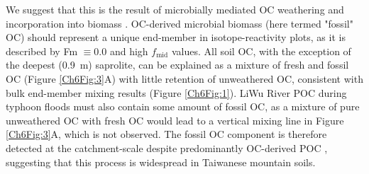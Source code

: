 We suggest that this is the result of microbially mediated OC weathering and incorporation into biomass \citep{Petsch:2001eq,Petsch:2005gd,Bardgett:2007eb,Schillawski:2008ko,Petsch:2014ct}. OC-derived microbial biomass (here termed "fossil" OC) should represent a unique end-member in isotope-reactivity plots, as it is described by Fm $\equiv 0.0$ and high $f_{\text{mid}}$ values. All soil OC, with the exception of the deepest (\SI{0.9}{m}) saprolite, can be explained as a mixture of fresh and fossil OC (Figure \ref{Ch6Fig:3}A) with little retention of unweathered OC, consistent with bulk end-member mixing results (Figure \ref{Ch6Fig:1}). LiWu River POC during typhoon floods must also contain some amount of fossil OC, as a mixture of pure unweathered OC with fresh OC would lead to a vertical mixing line in Figure \ref{Ch6Fig:3}A, which is not observed. The fossil OC component is therefore detected at the catchment-scale despite predominantly OC-derived POC \citep{Hilton:2011jw}, suggesting that this process is widespread in Taiwanese mountain soils. 

